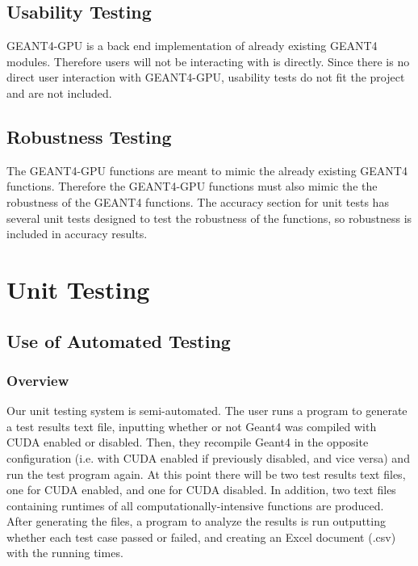 \documentclass[12pt]{article}
\begin{document}
\subsection{Usability Testing}
GEANT4-GPU is a back end implementation of already existing GEANT4 modules. Therefore users will not be interacting with is directly. Since there is no direct user interaction with GEANT4-GPU, usability tests do not fit the project and are not included.

\subsection{Robustness Testing}
The GEANT4-GPU functions are meant to mimic the already existing GEANT4 functions. Therefore the GEANT4-GPU functions must also mimic the the robustness of the GEANT4 functions. The accuracy section for unit tests has several unit tests designed to test the robustness of the functions, so robustness is included in accuracy results.

\section{Unit Testing}
\subsection{Use of Automated Testing}
\subsubsection{Overview}
Our unit testing system is semi-automated. The user runs a program to generate a test results text file, inputting whether or not Geant4 was compiled with CUDA enabled or disabled. Then, they recompile Geant4 in the opposite configuration (i.e. with CUDA enabled if previously disabled, and vice versa) and run the test program again. At this point there will be two test results text files, one for CUDA enabled, and one for CUDA disabled. In addition, two text files containing runtimes of all computationally-intensive functions are produced. After generating the files, a program to analyze the results is run outputting whether each test case passed or failed, and creating an Excel document (.csv) with the running times.
\end{document}

